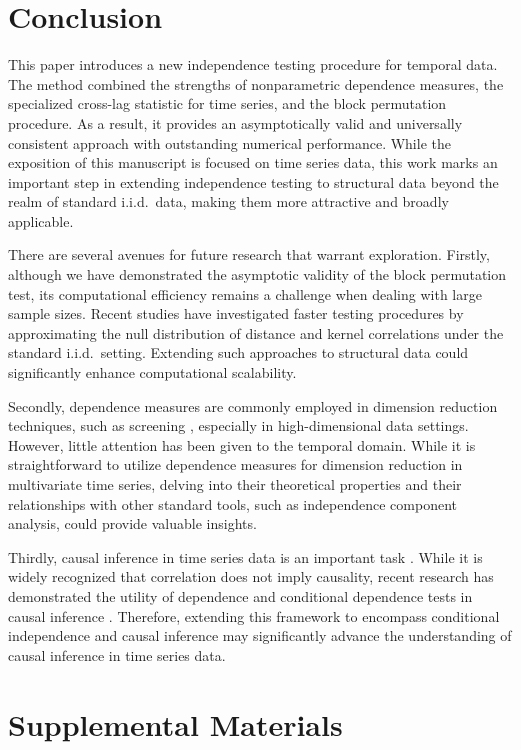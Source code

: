 \section{Conclusion}
\label{sec:discussion}
This paper introduces a new independence testing procedure for temporal data. The method combined the strengths of nonparametric dependence measures, the specialized cross-lag statistic for time series, and the block permutation procedure. As a result, it provides an asymptotically valid and universally consistent approach with outstanding numerical performance. While the exposition of this manuscript is focused on time series data, this work marks an important step in extending independence testing to structural data beyond the realm of standard i.i.d.~data, making them more attractive and broadly applicable.

There are several avenues for future research that warrant exploration. Firstly, although we have demonstrated the asymptotic validity of the block permutation test, its computational efficiency remains a challenge when dealing with large sample sizes. Recent studies \cite{zhang2018,fast1} have investigated faster testing procedures by approximating the null distribution of distance and kernel correlations under the standard i.i.d.~setting. Extending such approaches to structural data could significantly enhance computational scalability.

Secondly, dependence measures are commonly employed in dimension reduction techniques, such as screening \cite{FanLv2008,LiZhongZhu2012}, especially in high-dimensional data settings. However, little attention has been given to the temporal domain. While it is straightforward to utilize dependence measures for dimension reduction in multivariate time series, delving into their theoretical properties and their relationships with other standard tools, such as independence component analysis, could provide valuable insights.

Thirdly, causal inference in time series data is an important task \cite{haufe2010sparse,winkler2016validity}. While it is widely recognized that correlation does not imply causality, recent research has demonstrated the utility of dependence and conditional dependence tests in causal inference \cite{cai2022distribution,laumann2023kernel}. Therefore, extending this framework to encompass conditional independence and causal inference may significantly advance the understanding of causal inference in time series data.

\section{Supplemental Materials}
